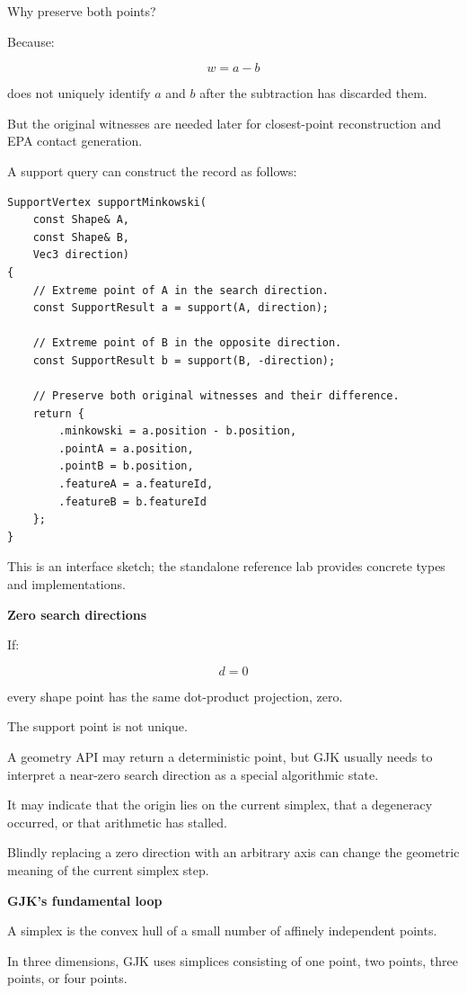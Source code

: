 Why preserve both points?

Because:

\[
w=a-b
\]

does not uniquely identify \(a\) and \(b\) after the subtraction has discarded them.

But the original witnesses are needed later for closest-point reconstruction and EPA contact generation.

A support query can construct the record as follows:

\begin{verbatim}
SupportVertex supportMinkowski(
    const Shape& A,
    const Shape& B,
    Vec3 direction)
{
    // Extreme point of A in the search direction.
    const SupportResult a = support(A, direction);

    // Extreme point of B in the opposite direction.
    const SupportResult b = support(B, -direction);

    // Preserve both original witnesses and their difference.
    return {
        .minkowski = a.position - b.position,
        .pointA = a.position,
        .pointB = b.position,
        .featureA = a.featureId,
        .featureB = b.featureId
    };
}
\end{verbatim}

This is an interface sketch; the standalone reference lab provides concrete types and implementations.

\textbf{Zero search directions}

If:

\[
d=0
\]

every shape point has the same dot-product projection, zero.

The support point is not unique.

A geometry API may return a deterministic point, but GJK usually needs to interpret a near-zero search direction as a special algorithmic state.

It may indicate that the origin lies on the current simplex, that a degeneracy occurred, or that arithmetic has stalled.

Blindly replacing a zero direction with an arbitrary axis can change the geometric meaning of the current simplex step.

\textbf{GJK's fundamental loop}

A simplex is the convex hull of a small number of affinely independent points.

In three dimensions, GJK uses simplices consisting of one point, two points, three points, or four points.

